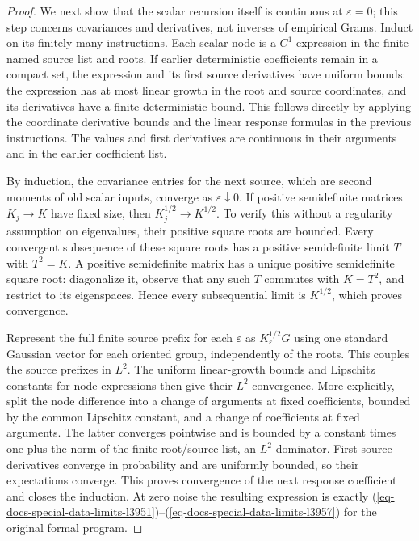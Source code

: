 \documentclass[
  11pt,
]{article}
\theoremstyle{definition}
\theoremstyle{plain}
\theoremstyle{plain}
\theoremstyle{plain}
\theoremstyle{remark}
\begin{document}
\begin{proof}
We next show that the scalar recursion itself is continuous at
\(\varepsilon=0\); this step concerns covariances and derivatives, not
inverses of empirical Grams. Induct on its finitely many instructions.
Each scalar node is a \(C^1\) expression in the finite named source list
and roots. If earlier deterministic coefficients remain in a compact
set, the expression and its first source derivatives have uniform
bounds: the expression has at most linear growth in the root and source
coordinates, and its derivatives have a finite deterministic bound. This
follows directly by applying the coordinate derivative bounds and the
linear response formulas in the previous instructions. The values and
first derivatives are continuous in their arguments and in the earlier
coefficient list.

By induction, the covariance entries for the next source, which are
second moments of old scalar inputs, converge as
\(\varepsilon\downarrow0\). If positive semidefinite matrices
\(K_j\to K\) have fixed size, then \(K_j^{1/2}\to K^{1/2}\). To verify
this without a regularity assumption on eigenvalues, their positive
square roots are bounded. Every convergent subsequence of these square
roots has a positive semidefinite limit \(T\) with \(T^2=K\). A positive
semidefinite matrix has a unique positive semidefinite square root:
diagonalize it, observe that any such \(T\) commutes with \(K=T^2\), and
restrict to its eigenspaces. Hence every subsequential limit is
\(K^{1/2}\), which proves convergence.

Represent the full finite source prefix for each \(\varepsilon\) as
\(K_\varepsilon^{1/2}G\) using one standard Gaussian vector for each
oriented group, independently of the roots. This couples the source
prefixes in \(L^2\). The uniform linear-growth bounds and Lipschitz
constants for node expressions then give their \(L^2\) convergence. More
explicitly, split the node difference into a change of arguments at
fixed coefficients, bounded by the common Lipschitz constant, and a
change of coefficients at fixed arguments. The latter converges
pointwise and is bounded by a constant times one plus the norm of the
finite root/source list, an \(L^2\) dominator. First source derivatives
converge in probability and are uniformly bounded, so their expectations
converge. This proves convergence of the next response coefficient and
closes the induction. At zero noise the resulting expression is exactly
(\ref{eq-docs-special-data-limits-l3951})--(\ref{eq-docs-special-data-limits-l3957})
for the original formal program.


\end{proof}
\end{document}
